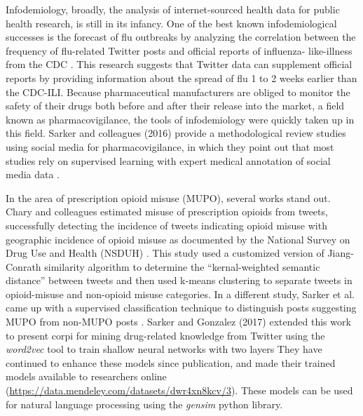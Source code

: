 \documentclass[sigconf]{acmart}
\begin{document}
Infodemiology, broadly, the analysis of internet-sourced health data for public 
health research, is still in its infancy. One of the best known infodemiological 
successes is the forecast of flu outbreaks by analyzing the correlation between 
the frequency of flu-related Twitter posts and official reports of influenza-
like-illness from the CDC \cite{culotta10, paul14}. This research suggests that 
Twitter data can supplement official reports by providing information about the 
spread of flu 1 to 2 weeks earlier than the CDC-ILI. Because pharmaceutical 
manufacturers are obliged to monitor the safety of their drugs both before and 
after their release into the market, a field known as pharmacovigilance, the 
tools of infodemiology were quickly taken up in this field. Sarker and 
colleagues (2016) provide a methodological review studies using social media 
for pharmacovigilance, in which they point out that most studies rely on 
supervised learning with expert medical annotation of social media data 
\cite{sarker16}. 

In the area of prescription opioid misuse (MUPO), several works stand out. 
Chary and colleagues estimated misuse of prescription opioids from tweets, 
successfully detecting the incidence of tweets indicating opioid misuse with 
geographic incidence of opioid misuse as documented by the National Survey 
on Drug Use and Health (NSDUH) \cite{chary17}. This study used a customized 
version of Jiang-Conrath similarity algorithm \cite{jiang97} to determine the 
``kernal-weighted semantic distance'' between tweets and then used k-means 
clustering to separate tweets in opioid-misuse and non-opioid misuse 
categories. In a different study, Sarker et al. came up with a supervised 
classification technique to distinguish posts suggesting MUPO from non-MUPO 
posts \cite{sarker15}. Sarker and Gonzalez (2017) extended this work to present 
corpi for mining drug-related knowledge from Twitter using the \emph{word2vec} 
tool to train shallow neural networks with two layers \cite{sarker17} They have 
continued to enhance these models since publication, and made their trained 
models available to researchers online 
(\url{https://data.mendeley.com/datasets/dwr4xn8kcv/3}). 
These models can be used for natural language processing using the 
\emph{gensim} python library.

\end{document}
